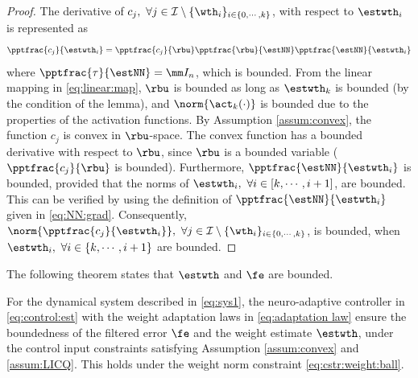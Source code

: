 \documentclass[lettersize,journal]{IEEEtran}
\begin{document}
\begin{proof}

The derivative of $c_j,\ \forall j\in\mathcal I \setminus \{\wth_i\}_{i\in\{0,\cdots,k\}}$, with respect to $\estwth_i$ is represented as
\begin{equation}
    \pptfrac{c_j}{\estwth_i} 
    = 
    \pptfrac{c_j}{\rbu} 
    \pptfrac{\rbu}{\estNN} 
    \pptfrac{\estNN}{\estwth_i}
\end{equation}
where $\pptfrac{\tau}{\estNN}=\mm I_n$, which is bounded. 
From the linear mapping in \eqref{eq:linear:map}, $\rbu$ is bounded as long as $\estwth_k$ is bounded (by the condition of the lemma), and $\norm{\act_k(\cdot)}$ is bounded due to the properties of the activation functions. 
By Assumption \ref{assum:convex}, the function $c_j$ is convex in $\rbu$-space.
The convex function has a bounded derivative with respect to $\rbu$, since $\rbu$ is a bounded variable (\ie $\pptfrac{c_j}{\rbu}$ is bounded). 
Furthermore, $\pptfrac{\estNN}{\estwth_i}$ is bounded, provided that the norms of $\estwth_i,\ \forall i \in[k,\cdots,i+1]$, are bounded. 
This can be verified by using the definition of $\pptfrac{\estNN}{\estwth_i}$ given in \eqref{eq:NN:grad}.
Consequently, $\norm{\pptfrac{c_j}{\estwth_i}},\ \forall j\in\mathcal I \setminus \{\wth_i\}_{i\in\{0,\cdots,k\}}$, is bounded, when $\estwth_i,\ \forall i\in \{k,\cdots,i+1\}$ are bounded.

\end{proof}

The following theorem states that $\estwth$ and $\fe$ are bounded.

\begin{theorem}
    For the dynamical system described in \eqref{eq:sys1}, the neuro-adaptive controller in \eqref{eq:control:est} with the weight adaptation laws in \eqref{eq:adaptation law} ensure the boundedness of the filtered error $\fe$ and the weight estimate $\estwth$, under the control input constraints satisfying Assumption \ref{assum:convex} and \ref{assum:LICQ}.
    This holds under the weight norm constraint \eqref{eq:cstr:weight:ball}.
\end{theorem}
\end{document}
